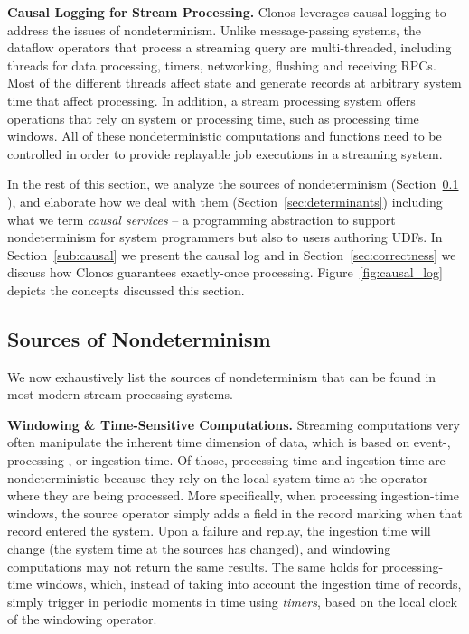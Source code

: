 \documentclass[sigconf]{acmart}
\newcommand{\para}[1]{\vspace{1mm}\noindent\textbf{#1.}}
\begin{document}
\para{Causal Logging for Stream Processing} Clonos leverages causal logging \cite{elnozahy1994manetho} to address the issues of nondeterminism. Unlike message-passing systems, the dataflow operators that process a streaming query are multi-threaded, including threads for data processing, timers, networking, flushing and receiving RPCs. Most of the different threads affect state and generate records at arbitrary system time that affect processing. In addition, a stream processing  system offers operations that rely on system or processing time, such as processing time windows. All of these nondeterministic computations and functions need to be controlled in order to provide replayable job executions in a streaming system.

\vspace{1mm}
In the rest of this section, we analyze the sources of nondeterminism (Section~\ref{sub:nondeterminism}%
), and elaborate how we deal with them (Section~\ref{sec:determinants}) including what we term \textit{causal services} -- a programming abstraction to support nondeterminism for system programmers but also to users authoring UDFs. In Section~\ref{sub:causal} we present the causal log and in Section~\ref{sec:correctness} we discuss how Clonos guarantees  exactly-once processing. Figure~\ref{fig:causal_log} depicts the concepts discussed this section.


\subsection{Sources of Nondeterminism}
\label{sub:nondeterminism}

We now exhaustively list the sources of nondeterminism that can be found in most modern stream processing systems. 

\para{Windowing \& Time-Sensitive Computations} Streaming computations very often manipulate the inherent time dimension of data, which is based on event-, processing-, or ingestion-time. Of those, processing-time and ingestion-time are nondeterministic because they rely on the local system time at the operator where they are being processed. More specifically, when processing ingestion-time windows, the source operator simply adds a field in the record marking when that record entered the system.  Upon a failure and replay, the ingestion time will change (the system time at the sources has changed), and windowing computations may not return the same results. The same holds for processing-time windows, which, instead of taking into account the ingestion time of records, simply trigger in periodic moments in time using \textit{timers}, based on the local clock of the windowing operator.
\end{document}
